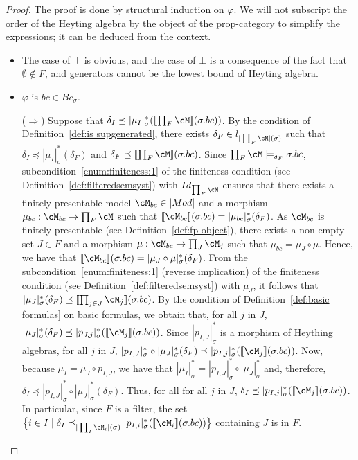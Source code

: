 \documentclass[preprint,3p,times]{elsarticle}
\def\sem#1{[\![ #1 ] \!]}
\newcommand{\bigset}[1]{\big\{#1\big\}}                     %
\begin{document}
\begin{proof}
    The proof is done by structural induction on $\varphi$. We will not subscript the order of the Heyting algebra by the object of the prop-category to simplify the expressions; it can be deduced from the context.
    \begin{itemize}
        \item The case of $\top$ is obvious, and the case of $\bot$ is a consequence of the fact that $\emptyset \notin F$, and generators cannot be the lowest bound of Heyting algebra.
        \item $\varphi$ is $bc \in Bc_\sigma$.

        \medskip
        ($\Rightarrow$) Suppose that $\delta_I \preceq |\mu_I|^*_\sigma(\sem{\prod_F \cM}(\sigma.bc))$.
        By the condition of Definition~\ref{def:is supgenerated}, there exists $\delta_F \in l_{|\prod_F \cM|(\sigma)}$ such that $\delta_I \preceq |\mu_I|^*_\sigma(\delta_F)$ and $\delta_F \preceq \sem{\prod_F \cM}(\sigma.bc)$.
        Since \(\prod_F \cM \models_{\delta_F} \sigma.bc \), subcondition~\ref{enum:finiteness:1} of the finiteness condition (see Definition~\ref{def:filteredsemsyst}) with \(Id_{ \prod_F \cM}\) ensures that there exists a finitely presentable model $\cM_{bc} \in |Mod|$ and a morphism $\mu_{bc} : \cM_{bc} \to \prod_F \cM$ such that $\sem{\cM_{bc}}(\sigma.bc) = |\mu_{bc}|^*_\sigma(\delta_F)$. As $\cM_{bc}$ is finitely presentable (see Definition~\ref{def:fp object}), there exists a non-empty set \(J\in F\) and a morphism $\mu : \cM_{bc} \to \prod_J \cM_j$ such that \(\mu_{bc} = \mu_J \circ \mu\).
        Hence, we have that $\sem{\cM_{bc}}(\sigma.bc) = |\mu_J \circ \mu|^*_\sigma(\delta_F)$.
        From the subcondition~\ref{enum:finiteness:1} (reverse implication) of the finiteness condition (see Definition~\ref{def:filteredsemsyst}) with \(\mu_J\), it follows that \(|\mu_J|^*_\sigma(\delta_F) \preceq \sem{\prod_{j\in J} \cM_j}(\sigma.bc)\).
        By the condition of Definition~\ref{def:basic formulas} on basic formulas, we obtain that, for all \(j\) in \(J\), \(|\mu_J|^*_\sigma(\delta_F) \preceq |p_{J,j}|^*_\sigma(\sem{\cM_j}(\sigma.bc))\).
        Since \(|p_{I,J}|^*_\sigma\) is a morphism of Heything algebras, for all \(j\) in \(J\), \(|p_{I,J}|^*_\sigma \circ |\mu_J|^*_\sigma(\delta_F) \preceq |p_{I,j}|^*_\sigma(\sem{\cM_j}(\sigma.bc))\).
        Now, because \(\mu_I = \mu_J \circ p_{I,J}\), we have that \(|\mu_I|^*_\sigma = |p_{I,J}|^*_\sigma \circ |\mu_J|^*_\sigma\) and, therefore, \(\delta_I \preceq |p_{I,J}|^*_\sigma \circ |\mu_J|^*_\sigma (\delta_F)\).
        Thus, for all for all \(j\) in \(J\), \(\delta_I \preceq |p_{I,j}|^*_\sigma(\sem{\cM_j}(\sigma.bc))\). In particular, since \(F\) is a filter, the set
        \(
            \bigset{i \in I \mid \delta_I \preceq_{|\prod_I \cM_i|(\sigma)} |p_{I,i}|^*_\sigma(\sem{\cM_i}(\sigma.bc))}
        \) containing \(J\) is in \(F\).


\end{itemize}
\end{proof}
\end{document}
